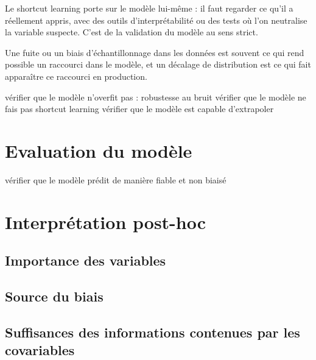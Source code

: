 	Le shortcut learning porte sur le modèle lui-même : il faut regarder ce qu'il a réellement appris, avec des outils d'interprétabilité ou des tests où l'on neutralise la variable suspecte. C'est de la validation du modèle au sens strict.
	
	Une fuite ou un biais d'échantillonnage dans les données est souvent ce qui rend possible un raccourci dans le modèle, et un décalage de distribution est ce qui fait apparaître ce raccourci en production.
	
	vérifier que le modèle n'overfit pas : robustesse au bruit
	vérifier que le modèle ne fais pas shortcut learning
	vérifier que le modèle est capable d'extrapoler 
	
	
	\section{Evaluation du modèle}
	vérifier que le modèle prédit de manière fiable et non biaisé
	
	\section{Interprétation post-hoc}
	\subsection{Importance des variables}
	\subsection{Source du biais} %
	\subsection{Suffisances des informations contenues par les covariables} %
	
	
